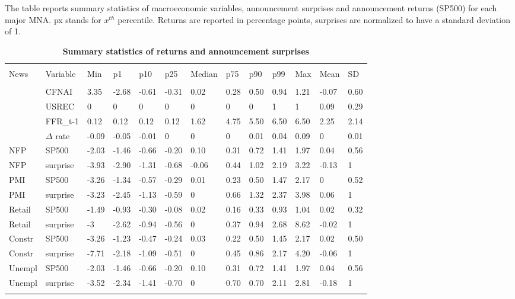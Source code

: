 \documentclass[12pt]{article}
\begin{document}
\begin{table}[!htbp] \centering 
  \caption{\textbf{Summary statistics of returns and announcement surprises}} 
  \label{}
  \begin{flushleft}
    {\medskip\small
 The table reports summary statistics of macroeconomic variables, announcement surprises and announcement returns (SP500) for each major MNA. px stands for $x^{th}$ percentile. Returns are reported in percentage points, surprises are normalized to have a standard deviation of 1.}
    \medskip
    \end{flushleft}
\begin{tabular}{@{\extracolsep{-3pt}} lllllllllllll} 
\\[-1.8ex]\hline 
\hline \\[-1.8ex] 
News & Variable & Min & p1 & p10 & p25 & Median & p75 & p90 & p99 & Max & Mean & SD \\ 
\hline \\[-1.8ex] 
 & CFNAI & 3.35 & -2.68 & -0.61 & -0.31 & 0.02 & 0.28 & 0.50 & 0.94 & 1.21 & -0.07 & 0.60 \\ 
 & USREC & 0 & 0 & 0 & 0 & 0 & 0 & 0 & 1 & 1 & 0.09 & 0.29 \\ 
 & FFR\_{t-1} & 0.12 & 0.12 & 0.12 & 0.12 & 1.62 & 4.75 & 5.50 & 6.50 & 6.50 & 2.25 & 2.14 \\ 
 & $\Delta$ rate & -0.09 & -0.05 & -0.01 & 0 & 0 & 0 & 0.01 & 0.04 & 0.09 & 0 & 0.01 \\ 
NFP & SP500 & -2.03 & -1.46 & -0.66 & -0.20 & 0.10 & 0.31 & 0.72 & 1.41 & 1.97 & 0.04 & 0.56 \\ 
NFP & surprise & -3.93 & -2.90 & -1.31 & -0.68 & -0.06 & 0.44 & 1.02 & 2.19 & 3.22 & -0.13 & 1 \\ 
PMI & SP500 & -3.26 & -1.34 & -0.57 & -0.29 & 0.01 & 0.23 & 0.50 & 1.47 & 2.17 & 0 & 0.52 \\ 
PMI & surprise & -3.23 & -2.45 & -1.13 & -0.59 & 0 & 0.66 & 1.32 & 2.37 & 3.98 & 0.06 & 1 \\ 
Retail & SP500 & -1.49 & -0.93 & -0.30 & -0.08 & 0.02 & 0.16 & 0.33 & 0.93 & 1.04 & 0.02 & 0.32 \\ 
Retail & surprise & -3 & -2.62 & -0.94 & -0.56 & 0 & 0.37 & 0.94 & 2.68 & 8.62 & -0.02 & 1 \\ 
Constr & SP500 & -3.26 & -1.23 & -0.47 & -0.24 & 0.03 & 0.22 & 0.50 & 1.45 & 2.17 & 0.02 & 0.50 \\ 
Constr & surprise & -7.71 & -2.18 & -1.09 & -0.51 & 0 & 0.45 & 0.86 & 2.17 & 4.20 & -0.06 & 1 \\ 
Unempl & SP500 & -2.03 & -1.46 & -0.66 & -0.20 & 0.10 & 0.31 & 0.72 & 1.41 & 1.97 & 0.04 & 0.56 \\ 
Unempl & surprise & -3.52 & -2.34 & -1.41 & -0.70 & 0 & 0.70 & 0.70 & 2.11 & 2.81 & -0.18 & 1 \\ 
\hline \\[-1.8ex] 
\end{tabular}
\end{table}
\end{document}
